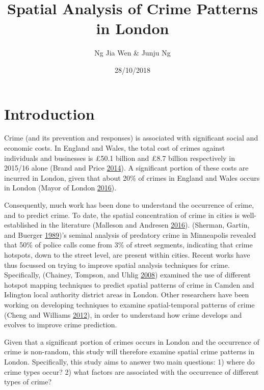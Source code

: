 \documentclass[]{article}
\title{Spatial Analysis of Crime Patterns in London}
\author{Ng Jia Wen \& Junju Ng}
\date{28/10/2018}
\theoremstyle{definition}
\theoremstyle{definition}
\theoremstyle{definition}
\theoremstyle{remark}
\begin{document}
\maketitle

{
\setcounter{tocdepth}{2}
\tableofcontents
}
\pagebreak

\pagebreak

\section{Introduction}\label{introduction}

Crime (and its prevention and responses) is associated with significant
social and economic costs. In England and Wales, the total cost of
crimes against individuals and businesses is £50.1 billion and £8.7
billion respectively in 2015/16 alone (Brand and Price
\protect\hyperlink{ref-Brand2014}{2014}). A significant portion of these
costs are incurred in London, given that about 20\% of crimes in England
and Wales occurs in London (Mayor of London
\protect\hyperlink{ref-MayorofLondon2016}{2016}).

Consequently, much work has been done to understand the occurrence of
crime, and to predict crime. To date, the spatial concentration of crime
in cities is well-established in the literature (Malleson and Andresen
\protect\hyperlink{ref-Malleson2016}{2016}). (Sherman, Gartin, and
Buerger \protect\hyperlink{ref-Sherman1989}{1989})'s seminal analysis of
predatory crime in Minneapolis revealed that 50\% of police calls come
from 3\% of street segments, indicating that crime hotspots, down to the
street level, are present within cities. Recent works have thus focussed
on trying to improve spatial analysis techniques for crime.
Specifically, (Chainey, Tompson, and Uhlig
\protect\hyperlink{ref-Chainey2008}{2008}) examined the use of different
hotspot mapping techniques to predict spatial patterns of crime in
Camden and Islington local authority district areas in London. Other
researchers have been working on developing techniques to examine
spatial-temporal patterns of crime (Cheng and Williams
\protect\hyperlink{ref-Cheng2012}{2012}), in order to understand how
crime develops and evolves to improve crime prediction.

Given that a significant portion of crimes occurs in London and the
occurrence of crime is non-random, this study will therefore examine
spatial crime patterns in London. Specifically, this study aims to
answer two main questions: 1) where do crime types occur? 2) what
factors are associated with the occurrence of different types of crime?
\end{document}
